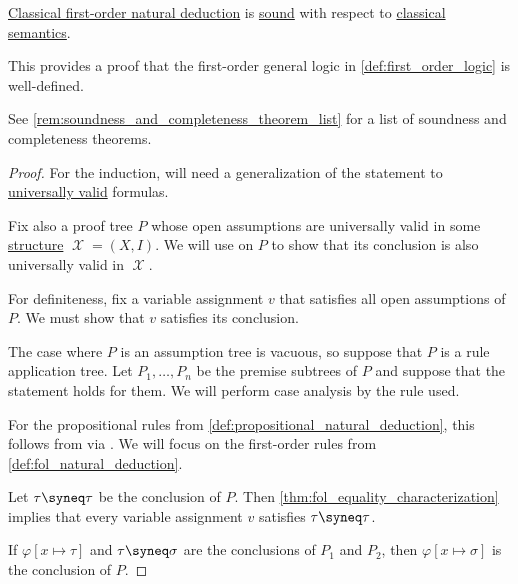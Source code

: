 \begin{theorem}\label{thm:fol_natural_deduction_soundness}
  \hyperref[def:fol_natural_deduction]{Classical first-order natural deduction} is \hyperref[def:general_logic]{sound} with respect to \hyperref[def:truth_value_algebra/classical]{classical} \hyperref[def:fol_semantics]{semantics}.
\end{theorem}
\begin{comments}
  \item This provides a proof that the first-order general logic in \cref{def:first_order_logic} is well-defined.
  \item See \cref{rem:soundness_and_completeness_theorem_list} for a list of soundness and completeness theorems.
\end{comments}
\begin{proof}
  For the induction, will need a generalization of the statement to \hyperref[def:fol_universal_validity]{universally valid} formulas.

  Fix also a proof tree \( P \) whose open assumptions are universally valid in some \hyperref[def:fol_structure]{structure} \( \mscrX = (X, I) \). We will use  on \( P \) to show that its conclusion is also universally valid in \( \mscrX \).

  For definiteness, fix a variable assignment \( v \) that satisfies all open assumptions of \( P \). We must show that \( v \) satisfies its conclusion.

  The case where \( P \) is an assumption tree is vacuous, so suppose that \( P \) is a rule application tree. Let \( P_1, \ldots, P_n \) be the premise subtrees of \( P \) and suppose that the statement holds for them. We will perform case analysis by the rule used.

  For the propositional rules from \cref{def:propositional_natural_deduction}, this follows from  via . We will focus on the first-order rules from \cref{def:fol_natural_deduction}.

   Let \( \tau \syneq \tau \) be the conclusion of \( P \). Then \cref{thm:fol_equality_characterization} implies that every variable assignment \( v \) satisfies \( \tau \syneq \tau \).

   If \( \varphi[x \mapsto \tau] \) and \( \tau \syneq \sigma \) are the conclusions of \( P_1 \) and \( P_2 \), then \( \varphi[x \mapsto \sigma] \) is the conclusion of \( P \).


\end{proof}
